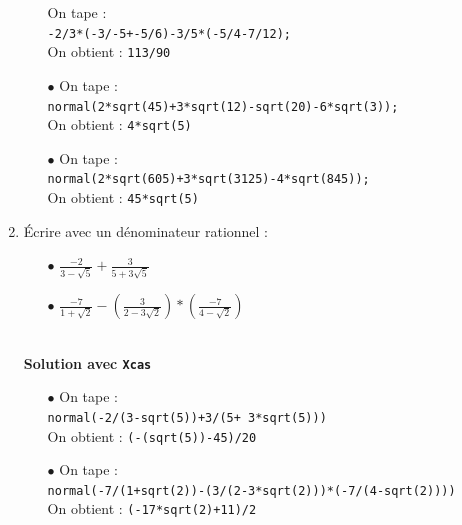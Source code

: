 \documentclass[a4paper,11pt]{book}
\begin{document}
\begin{enumerate}
\begin{itemize}
On tape :\\
{\tt -2/3*(-3/-5+-5/6)-3/5*(-5/4-7/12);}\\
On obtient : {\tt 113/90}
\item[$\bullet$]
On tape :\\
{\tt normal(2*sqrt(45)+3*sqrt(12)-sqrt(20)-6*sqrt(3));}\\
On obtient : {\tt 4*sqrt(5)}
\item[$\bullet$]
On tape :\\
{\tt normal(2*sqrt(605)+3*sqrt(3125)-4*sqrt(845));}\\
On obtient : {\tt 45*sqrt(5)}
\end{itemize}
\item \'Ecrire avec un d\'enominateur rationnel :
\begin{itemize}
\item[$\bullet$]
$\displaystyle \frac{-2}{3-\sqrt 5}+\frac{3}{5+3\sqrt 5}$
\item[$\bullet$]
$\displaystyle \frac{-7}{1+\sqrt 2}-(\frac{3}{2-3\sqrt 2})*(\frac{-7}{4-\sqrt 2})$
\end{itemize}
\ \\
{\bf Solution avec {\tt Xcas}}
\begin{itemize}
\item[$\bullet$]
On tape :\\
{\tt normal(-2/(3-sqrt(5))+3/(5+ 3*sqrt(5)))}\\
On obtient : {\tt (-(sqrt(5))-45)/20}
\item[$\bullet$]
On tape :\\
{\tt normal(-7/(1+sqrt(2))-(3/(2-3*sqrt(2)))*(-7/(4-sqrt(2))))}\\
On obtient : {\tt (-17*sqrt(2)+11)/2}
\end{itemize}
\end{enumerate}
\end{document}
